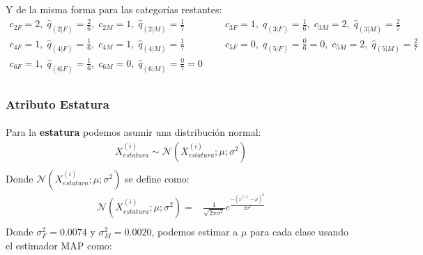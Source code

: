 \documentclass[12pt]{article}
\begin{document}
 Y de la misma forma para las categorías restantes:
 \begin{equation}
 \begin{split}
 c_{2F} = 2, \; \hat{q}_{(2|F)} = \frac{2}{6}, \; c_{2M} = 1, \; \hat{q}_{(2|M)} = \frac{1}{7} \; \; \; \; \; \; \; \; \; \; \; \; &  c_{3F} = 1, \; \hat{q}_{(3|F)} = \frac{1}{6}, \; c_{3M} = 2, \; \hat{q}_{(3|M)} = \frac{2}{7}\\
 c_{4F} = 1, \; \hat{q}_{(4|F)} = \frac{1}{6}, \; c_{4M} = 1, \; \hat{q}_{(4|M)} = \frac{1}{7} \; \; \; \; \; \; \; \; \; \; \; \; &  c_{5F} = 0, \; \hat{q}_{(5|F)} = \frac{0}{6} = 0, \; c_{5M} = 2, \; \hat{q}_{(5|M)} = \frac{2}{7}\\ 
 c_{6F} = 1, \; \hat{q}_{(6|F)} = \frac{1}{6}, \;c_{6M} = 0, \; \hat{q}_{(6|M)} = \frac{0}{7} = 0\\
 \end{split}
 \end{equation}
 \subsubsection{Atributo Estatura}
 \paragraph{}Para la \textbf{estatura} podemos asumir una distribución normal:
 \begin{equation}
 \begin{split}
 X_{estatura}^{(i)}\sim \mathcal{N}(X_{estatura}^{(i)};\mu;\sigma^2)\\
 \end{split}
 \end{equation}
 Donde $\mathcal{N}(X_{estatura}^{(i)};\mu;\sigma^2)$ se define como:\\
 \begin{equation}
 \begin{split}
 \mathcal{N}(X_{estatura}^{(i)};\mu;\sigma^2) =& \frac{1}{\sqrt{2\pi\sigma^2}}e^{\frac{-(x^{(i)} - \mu)^2}{2\sigma^2}}\\
 \end{split}
 \end{equation}
 Donde $\sigma_F^2 = 0.0074$ y $\sigma_M^2 = 0.0020$, podemos estimar a $\mu$ para cada clase usando el estimador MAP como:
\end{document}
